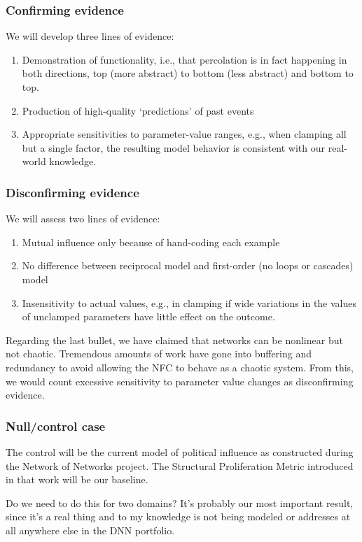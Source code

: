 \documentclass{article} %
\begin{document}
\subsubsection{Confirming evidence}
We will develop three lines of evidence:
\begin{enumerate}
\item Demonstration of functionality, i.e., that percolation is in fact happening in both directions, top (more abstract) to bottom (less abstract) and bottom to top. 
\item Production of high-quality `predictions' of past events
\item Appropriate sensitivities to parameter-value ranges, e.g., when clamping all but a single factor, the resulting model behavior is consistent with our real-world knowledge.
\end{enumerate}

\subsubsection{Disconfirming evidence}
We will assess two lines of evidence:
\begin{enumerate}
\item Mutual influence only because of hand-coding each example
\item No difference between reciprocal model and first-order (no loops or cascades) model 
\item Insensitivity to actual values, e.g., in clamping if wide variations in the values of unclamped parameters have little effect on the outcome.
\end{enumerate}
Regarding the last bullet, we have claimed that networks can be nonlinear but not chaotic. Tremendous amounts of work have gone into buffering and redundancy to avoid allowing  the NFC to behave as a chaotic system. From this, we would count excessive sensitivity to parameter value changes as disconfirming evidence. 

\subsubsection{Null/control case}
The control will be the current model of political influence as constructed during the Network of Networks project. The Structural Proliferation Metric introduced in that work will be our baseline.

{\color {red} Do we need to do this for two domains? It's probably our most important result, since it's a real thing and to my knowledge is not being modeled or addresses at all anywhere else in the DNN portfolio.}
\end{document}
